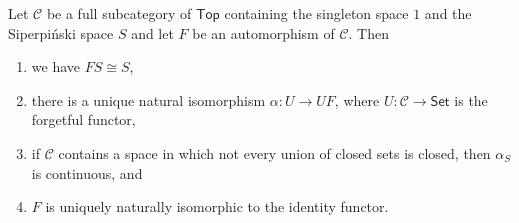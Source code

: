 Let $\mathcal{C}$ be a full subcategory of $\mathsf{Top}$ containing the singleton
space $1$ and the Siperpiński space $S$ and let $F$ be an automorphism of $\mathcal{C}$.
Then
\begin{enumerate}[label=(\alph*)]
	\item we have $FS\cong S$,
	\item there is a unique natural isomorphism $\alpha\colon U\to UF$, where
		$U\colon \mathcal{C}\to\mathsf{Set}$ is the forgetful functor,
	\item if $\mathcal{C}$ contains a space in which not every union of closed sets
		is closed, then $\alpha_S$ is continuous, and
	\item $F$ is uniquely naturally isomorphic to the identity functor.
\end{enumerate}
